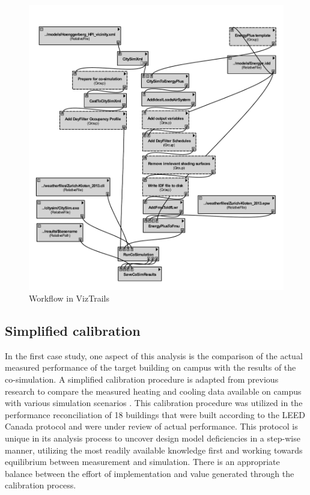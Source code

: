 \documentclass{tBPS2e}
\theoremstyle{plain}
\theoremstyle{definition}
\theoremstyle{remark}
\begin{document}
\begin{figure}[H]
  \centering
  \includegraphics[width=1.0\textwidth]{figures/36-cosim-HPI}
  \caption{Workflow in VizTrails
  \label{VizTrails}}
\end{figure}

\subsection{Simplified calibration}
In the first case study, one aspect of this analysis is the comparison of the actual 
measured performance of the target building on campus with the 
results of the co-simulation. A simplified calibration procedure is
adapted from previous research to compare the measured heating and cooling
data available on campus with various simulation scenarios
\citep{samuelson_analysis_2015}. This calibration procedure was utilized in the
performance reconciliation of 18 buildings that were built according to the
LEED Canada protocol and were under review of actual performance. This
protocol is unique in its analysis process to uncover design model
deficiencies in a step-wise manner, utilizing the most readily available
knowledge first and working towards equilibrium between measurement and
simulation. There is an appropriate balance between the effort of implementation and value
generated through the calibration process.
 
\end{document}
